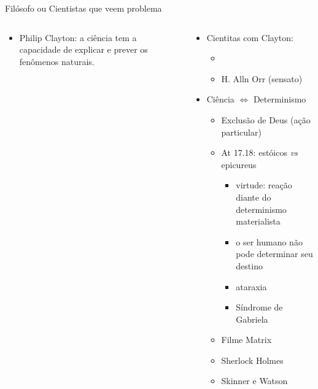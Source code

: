 \begin{frame}{Filósofo ou Cientistas que veem problema}
 \begin{columns}
	 \begin{column}{0.45\textwidth}
	  \begin{itemize}
			 \justifying
		  \item<2-3,8-14>[$\bullet$] \textcolor{NordBrightCyan}{Philip Clayton}: a ciência 
				 tem a capacidade de explicar e prever os fenômenos naturais.
	  \end{itemize}
			\vspace{0.5cm}
			\centering
		\end{column}
		\begin{column}{0.55\textwidth}
		 \begin{itemize}
			 \item<3-> Cientitas com Clayton: 
				 \begin{itemize}
					 \item<4->  \onslide<6->{(loucos?)}
					 \item<7-> H. Alln Orr (sensato)
					\end{itemize}
				\item<8-|alert@8> Ciência $\Longleftrightarrow$ \textcolor{NordYellow}{Determinismo}
					\begin{itemize}
						\item<9-> Exclusão de Deus (ação particular)
						\item<10-> At 17.18: estóicos \textit{vs} epicureus
							\begin{itemize}
								\item<11-> virtude: reação diante do determinismo materialista
								\item<12-> o ser humano não pode determinar seu destino
								\item<13-> ataraxia
								\item<14-> Síndrome de Gabriela
							\end{itemize}
						\item<15-> Filme Matrix
						\item<16-> Sherlock Holmes
						\item<17-> Skinner e Watson
					\end{itemize}
			\end{itemize}
		\end{column}
	\end{columns}
\end{frame}

